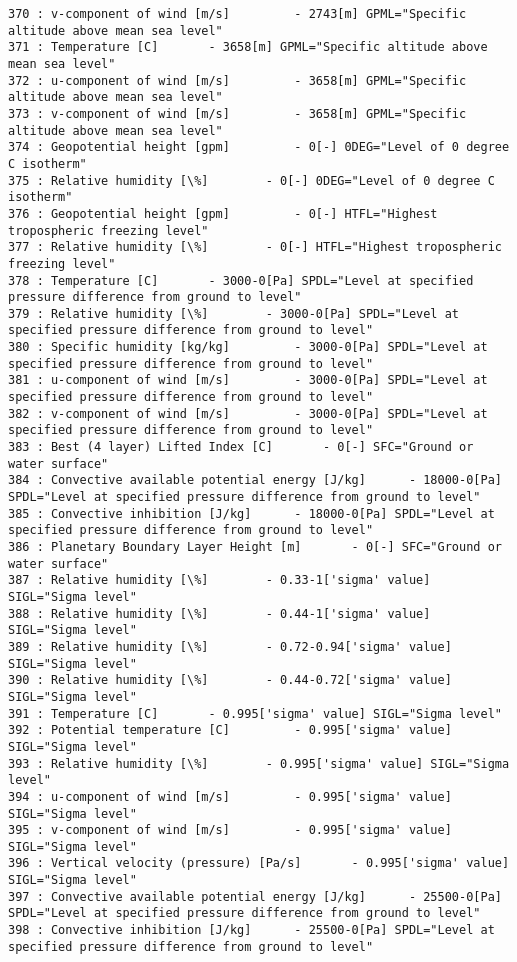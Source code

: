 \documentclass[11pt]{article}
\begin{document}
\begin{Verbatim}[commandchars=\\\{\}]
370 : v-component of wind [m/s] 		- 2743[m] GPML="Specific altitude above mean sea level"
371 : Temperature [C] 		- 3658[m] GPML="Specific altitude above mean sea level"
372 : u-component of wind [m/s] 		- 3658[m] GPML="Specific altitude above mean sea level"
373 : v-component of wind [m/s] 		- 3658[m] GPML="Specific altitude above mean sea level"
374 : Geopotential height [gpm] 		- 0[-] 0DEG="Level of 0 degree C isotherm"
375 : Relative humidity [\%] 		- 0[-] 0DEG="Level of 0 degree C isotherm"
376 : Geopotential height [gpm] 		- 0[-] HTFL="Highest tropospheric freezing level"
377 : Relative humidity [\%] 		- 0[-] HTFL="Highest tropospheric freezing level"
378 : Temperature [C] 		- 3000-0[Pa] SPDL="Level at specified pressure difference from ground to level"
379 : Relative humidity [\%] 		- 3000-0[Pa] SPDL="Level at specified pressure difference from ground to level"
380 : Specific humidity [kg/kg] 		- 3000-0[Pa] SPDL="Level at specified pressure difference from ground to level"
381 : u-component of wind [m/s] 		- 3000-0[Pa] SPDL="Level at specified pressure difference from ground to level"
382 : v-component of wind [m/s] 		- 3000-0[Pa] SPDL="Level at specified pressure difference from ground to level"
383 : Best (4 layer) Lifted Index [C] 		- 0[-] SFC="Ground or water surface"
384 : Convective available potential energy [J/kg] 		- 18000-0[Pa] SPDL="Level at specified pressure difference from ground to level"
385 : Convective inhibition [J/kg] 		- 18000-0[Pa] SPDL="Level at specified pressure difference from ground to level"
386 : Planetary Boundary Layer Height [m] 		- 0[-] SFC="Ground or water surface"
387 : Relative humidity [\%] 		- 0.33-1['sigma' value] SIGL="Sigma level"
388 : Relative humidity [\%] 		- 0.44-1['sigma' value] SIGL="Sigma level"
389 : Relative humidity [\%] 		- 0.72-0.94['sigma' value] SIGL="Sigma level"
390 : Relative humidity [\%] 		- 0.44-0.72['sigma' value] SIGL="Sigma level"
391 : Temperature [C] 		- 0.995['sigma' value] SIGL="Sigma level"
392 : Potential temperature [C] 		- 0.995['sigma' value] SIGL="Sigma level"
393 : Relative humidity [\%] 		- 0.995['sigma' value] SIGL="Sigma level"
394 : u-component of wind [m/s] 		- 0.995['sigma' value] SIGL="Sigma level"
395 : v-component of wind [m/s] 		- 0.995['sigma' value] SIGL="Sigma level"
396 : Vertical velocity (pressure) [Pa/s] 		- 0.995['sigma' value] SIGL="Sigma level"
397 : Convective available potential energy [J/kg] 		- 25500-0[Pa] SPDL="Level at specified pressure difference from ground to level"
398 : Convective inhibition [J/kg] 		- 25500-0[Pa] SPDL="Level at specified pressure difference from ground to level"

\end{Verbatim}
\end{document}

